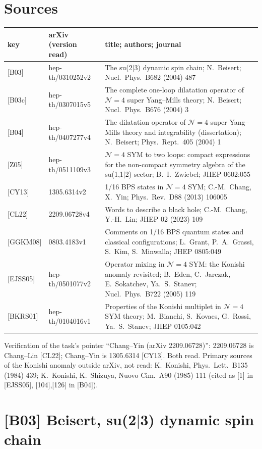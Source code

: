 \documentclass[10pt]{article}
\begin{document}
\section{Sources}
\begin{longtable}{p{1.5cm}p{2.6cm}p{12cm}}
key & arXiv (version read) & title; authors; journal \\ \hline
{[B03]} & hep-th/0310252v2 & The su(2$|$3) dynamic spin chain; N.~Beisert; Nucl.\ Phys.\ B682 (2004) 487 \\
{[B03c]} & hep-th/0307015v5 & The complete one-loop dilatation operator of $\mathcal N=4$ super Yang--Mills theory; N.~Beisert; Nucl.\ Phys.\ B676 (2004) 3 \\
{[B04]} & hep-th/0407277v4 & The dilatation operator of $\mathcal N=4$ super Yang--Mills theory and integrability (dissertation); N.~Beisert; Phys.\ Rept.\ 405 (2004) 1 \\
{[Z05]} & hep-th/0511109v3 & $\mathcal N=4$ SYM to two loops: compact expressions for the non-compact symmetry algebra of the su(1,1$|$2) sector; B.~I.~Zwiebel; JHEP 0602:055 \\
{[CY13]} & 1305.6314v2 & 1/16 BPS states in $\mathcal N=4$ SYM; C.-M.~Chang, X.~Yin; Phys.\ Rev.\ D88 (2013) 106005 \\
{[CL22]} & 2209.06728v4 & Words to describe a black hole; C.-M.~Chang, Y.-H.~Lin; JHEP 02 (2023) 109 \\
{[GGKM08]} & 0803.4183v1 & Comments on 1/16 BPS quantum states and classical configurations; L.~Grant, P.~A.~Grassi, S.~Kim, S.~Minwalla; JHEP 0805:049 \\
{[EJSS05]} & hep-th/0501077v2 & Operator mixing in $\mathcal N=4$ SYM: the Konishi anomaly revisited; B.~Eden, C.~Jarczak, E.~Sokatchev, Ya.~S.~Stanev; Nucl.\ Phys.\ B722 (2005) 119 \\
{[BKRS01]} & hep-th/0104016v1 & Properties of the Konishi multiplet in $\mathcal N=4$ SYM theory; M.~Bianchi, S.~Kovacs, G.~Rossi, Ya.~S.~Stanev; JHEP 0105:042 \\
\end{longtable}
Verification of the task's pointer ``Chang--Yin (arXiv 2209.06728)'': 2209.06728 is Chang--Lin [CL22]; Chang--Yin is 1305.6314 [CY13]. Both read.
Primary sources of the Konishi anomaly outside arXiv, not read: K.~Konishi, Phys.\ Lett.\ B135 (1984) 439; K.~Konishi, K.~Shizuya, Nuovo Cim.\ A90 (1985) 111 (cited as [1] in [EJSS05], [104],[126] in [B04]).

\section{[B03] Beisert, su(2$|$3) dynamic spin chain}
\end{document}
